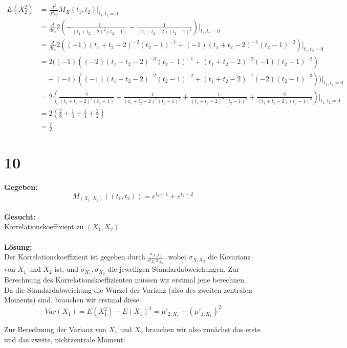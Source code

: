 \documentclass{article}
\begin{document}
\begin{align*}
    E(X_2^2) &= \frac{d^2}{d^2t_2} M_X(t_1, t_2) \big|_{t_1, t_2 = 0} \\
    &= \frac{d}{dt_2} 2 (-\frac{1}{(t_1 + t_2 -2)^2(t_2 - 1)} - \frac{1}{(t_1 + t_2 -2)(t_2 - 1)^{2}} ) \big|_{t_1, t_2 = 0} \\
    &= \frac{d}{dt_2}2 ((-1)(t_1 + t_2 -2)^{-2}(t_2 - 1)^{-1} + (-1)(t_1 + t_2 -2)^{-1}(t_2 - 1)^{-2})\big|_{t_1, t_2 = 0} \\
    &= 2((-1)((-2) (t_1 + t_2 -2)^{-3}(t_2 - 1)^{-1} + (t_1 + t_2 -2)^{-2}(-1)(t_2 - 1)^{-2})\\ 
    &\quad +(-1)((-1)(t_1 + t_2 -2)^{-2}(t_2-1)^{-2} + (t_1 + t_2 -2)^{-1}(-2)(t_2-1)^{-3})) \big|_{t_1, t_2 = 0}\\
    &= 2(\frac{2}{(t_1 + t_2 -2)^{3}(t_2 - 1)} + \frac{1}{(t_1 + t_2 -2)^{2}(t_2 - 1)^{2}} + \frac{1}{(t_1 + t_2 -2)^2(t_2-1)^2} + \frac{2}{(t_1+ t_2 -2)(t_2-1)^3}) \big|_{t_1, t_2 = 0} \\
    &= 2(\frac{2}{8} + \frac{1}{4} + \frac{1}{4} + \frac{2}{2}) \\
    &= \frac{7}{2}
\end{align*}
\section*{10}
\textbf{Gegeben:}
\[M_{(X_1, X_2)}((t_1, t_2)) = e^{t_1-1} + e^{t_2-2} \] \\
\textbf{Gesucht:}\\

Korrelationskoeffizient zu $(X_1, X_2)$\\ \\
\textbf{Lösung:}\\

Der Korrelationskoeffizient ist gegeben durch $\frac{\sigma_{X_1 X_2}}{\sigma_{X_1} \sigma_{X_2}}$, wobei $\sigma_{X_1 X_2}$ die Kovarianz von $X_1$ und $X_2$ ist, und $\sigma_{X_1}, \sigma_{X_2}$ die jeweiligen Standardabweichungen. Zur Berechnung des Korrelationskoeffizienten müssen wir erstmal jene berechnen. \\

Da die Standardabweichung die Wurzel der Varianz (also des zweiten zentralen Moments) sind, brauchen wir erstmal diese:
\[Var(X_1) = E(X_1^2)- E(X_1)^2 = \mu'_{2, X_1} - (\mu'_{1, X_1})^2\] 

Zur Berechnung der Varianz von $X_1$ und $X_2$ brauchen wir also zunächst das erste und das zweite, nichtzentrale Moment:
\end{document}
